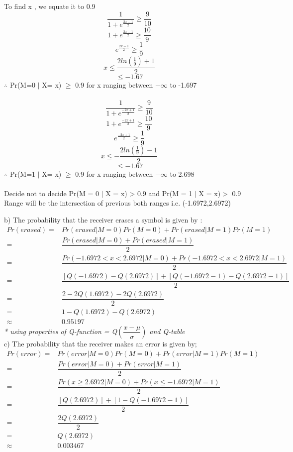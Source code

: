 \documentclass{article}
\begin{document}
\begin{enumerate}
To find x , we equate it to 0.9\\
$$ \frac{1}{1+e^\frac{{2x-1}}{2}} \geq \frac{9}{10}$$
$$1+e^\frac{{2x-1}}{2} \geq \frac{10}{9}$$
$$e^\frac{2x-1}{2} \geq \frac{1}{9}$$
$$ x \leq \frac{2ln(\frac{1}{9})+1}{2}$$
$$    \leq -1.67 $$
$\therefore$  Pr(M=0  $ | $ X= x) $\geq$ 0.9 for x ranging between $-\infty$ to -1.697 \\ \\

$$ \frac{1}{1+e^\frac{{-2x+1}}{2}} \geq \frac{9}{10}$$
$$1+e^\frac{{-2x+1}}{2} \geq \frac{10}{9}$$
$$e^\frac{-2x+1}{2} \geq \frac{1}{9}$$
$$ x \leq -\frac{2ln(\frac{1}{9})-1}{2}$$
$$    \leq -1.67 $$
$\therefore$  Pr(M=1  $ | $ X= x) $\geq$ 0.9 for x ranging between $-\infty$ to 2.698\\ \\

Decide not to decide Pr(M = 0 $|$ X = x) > 0.9 and Pr(M = 1 $|$ X = x)$ >$ 0.9
Range will be the intersection of previous both ranges i.e. (-1.6972,2.6972)


b) The probability that the receiver erases a symbol is given by :
    \begin{align*}
        Pr(erased) =& Pr(erased|M = 0)Pr(M = 0)+Pr(erased|M = 1)Pr(M = 1)\\
        =& \dfrac{Pr(erased|M = 0) + Pr(erased|M = 1)}{2}\\
        =& \dfrac{Pr(-1.6972 < x< 2.6972|M = 0) + Pr(-1.6972 < x< 2.6972|M = 1)}{2}\\
        =& \dfrac{[Q(-1.6972)-Q(2.6972)] + [Q(-1.6972-1)-Q(2.6972-1)]}{2}\\
        =& \dfrac{2-2Q(1.6972)-2Q(2.6972)}{2}\\
        =& 1-Q(1.6972)-Q(2.6972)\\
        \approx& 0.95197
    \end{align*}
    \textit{* using properties of Q-function = Q$\left(\dfrac{x-\mu}{\sigma}\right)$ and Q-table}\\

c)  The probability that the receiver makes an error is given by;
    \begin{align*}
        Pr(error) =& Pr(error|M = 0)Pr(M = 0)+Pr(error|M = 1)Pr(M = 1)\\
        =& \dfrac{Pr(error|M = 0) + Pr(error|M = 1)}{2}\\
        =& \dfrac{Pr(x \geq 2.6972|M = 0) + Pr(x \leq -1.6972|M = 1)}{2}\\
        =& \dfrac{[Q(2.6972)] + [1-Q(-1.6972-1)]}{2}\\
        =& \dfrac{2Q(2.6972)}{2}\\
        =& Q(2.6972)\\
        \approx& 0.003467
    \end{align*}


\end{enumerate}
\end{document}
